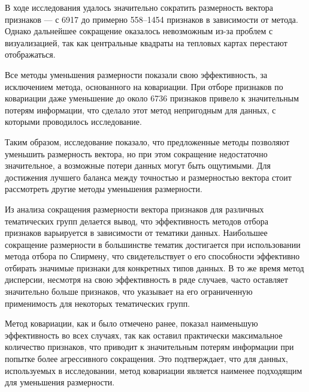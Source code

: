 
В ходе исследования удалось значительно сократить размерность вектора признаков — с 6917 до примерно 558–1454 признаков в зависимости от метода. 
Однако дальнейшее сокращение оказалось невозможным из-за проблем с визуализацией, так как центральные квадраты на тепловых картах перестают отображаться.

Все методы уменьшения размерности показали свою эффективность, за исключением метода, основанного на ковариации. 
При отборе признаков по ковариации даже уменьшение до около 6736 признаков привело к значительным потерям информации, 
что сделало этот метод непригодным для данных, с которыми проводилось исследование.

Таким образом, исследование показало, что предложенные методы позволяют уменьшить размерность вектора, 
но при этом сокращение недостаточно значительное, а возможные потери данных могут быть ощутимыми. 
Для достижения лучшего баланса между точностью и размерностью вектора стоит рассмотреть другие методы уменьшения размерности.

Из анализа сокращения размерности вектора признаков для различных тематических групп делается вывод, 
что эффективность методов отбора признаков варьируется в зависимости от тематики данных. 
Наибольшее сокращение размерности в большинстве тематик достигается при использовании метода отбора по Спирмену, 
что свидетельствует о его способности эффективно отбирать значимые признаки для конкретных типов данных. 
В то же время метод дисперсии, несмотря на свою эффективность в ряде случаев, часто оставляет значительно больше признаков, 
что указывает на его ограниченную применимость для некоторых тематических групп.

Метод ковариации, как и было отмечено ранее, показал наименьшую эффективность во всех случаях, 
так как оставил практически максимальное количество признаков, 
что приводит к значительным потерям информации при попытке более агрессивного сокращения. 
Это подтверждает, что для данных, используемых в исследовании, метод ковариации является наименее подходящим для уменьшения размерности.